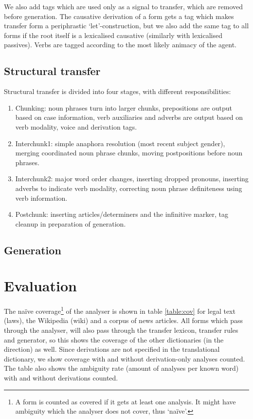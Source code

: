 We also add tags which are used only as a signal to transfer, which
are removed before generation. The causative derivation of a form gets
a tag which makes transfer form a periphrastic `let'-construction, but
we also add the same tag to all forms if the root itself is a
lexicalised causative (similarly with lexicalised passives). Verbs are
tagged according to the most likely animacy of the agent.

\subsection{Structural transfer}
\label{sec:structural-transfer}
Structural transfer is divided into four stages, with different
responsibilities:

\begin{enumerate}

\item Chunking: noun phrases turn into larger chunks, prepositions are
  output based on case information, verb auxiliaries and adverbs are
  output based on verb modality, voice and derivation tags.

\item Interchunk1: simple anaphora resolution (most recent subject
  gender), merging coordinated noun phrase chunks, moving
  postpositions before noun phrases.

\item Interchunk2: major word order changes, inserting dropped
  pronouns, inserting adverbs to indicate verb modality, correcting
  noun phrase definiteness using verb information.

\item Postchunk: inserting articles/determiners and the infinitive
  marker, tag cleanup in preparation of generation.
\end{enumerate}


\subsection{Generation}

\section{Evaluation}
\label{sec:eval}
The naïve coverage\footnote{A form is counted as covered if it gets at
  least one analysis. It might have ambiguity which the analyser does
  not cover, thus `naïve'.} of the analyser is shown in table
\ref{table:cov} for legal text (laws), the \sme{} Wikipedia (wiki) and
a corpus of \sme{} news articles. All forms which pass through the
analyser, will also pass through the transfer lexicon, transfer rules
and generator, so this shows the coverage of the other dictionaries
(in the \smenob{} direction) as well. Since derivations are not
specified in the translational dictionary, we show coverage with and
without derivation-only analyses counted. The table also shows the
ambiguity rate (amount of analyses per known word) with and without
derivations counted. 


